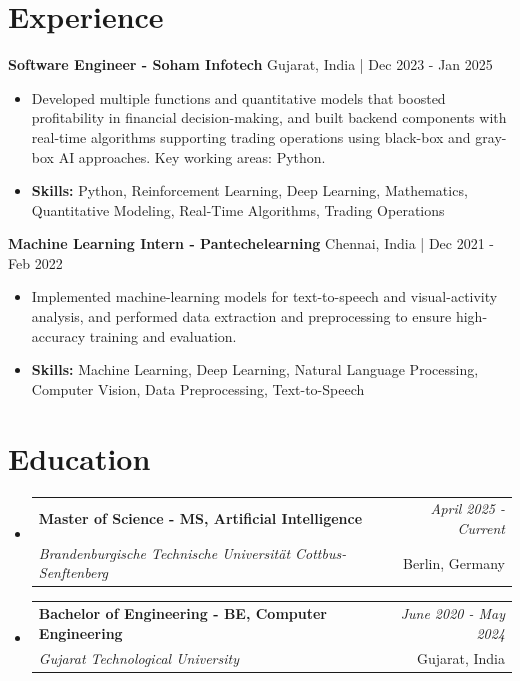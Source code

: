 \documentclass[a4paper,11pt]{article}
\makeatletter
\newcommand{\resumeSubheading}[4]{
\vspace{0.5mm}\item
    \begin{tabular*}{\linewidth}[t]{l@{\extracolsep{\fill}}r}
        \textbf{#1} & \textit{\footnotesize{#4}} \\
        \textit{\footnotesize{#3}} &  \footnotesize{#2}\\
    \end{tabular*}
    \vspace{-2.4mm}
}
\makeatother
\begin{document}
\section{\textbf{Experience}}


\vspace{1mm}
  \textbf{Software Engineer - Soham Infotech} \hfill Gujarat, India | Dec 2023 - Jan 2025
\vspace{-1.5mm} %
\begin{itemize}
  \item Developed multiple functions and quantitative models that boosted profitability in financial decision-making, and built backend components with real-time algorithms supporting trading operations using black-box and gray-box AI approaches. Key working areas: Python.

\vspace{-2mm}
  \item \textbf{Skills:} Python, Reinforcement Learning, Deep Learning, Mathematics, Quantitative Modeling, Real-Time Algorithms, Trading Operations
\end{itemize}

\vspace{1mm}
  \textbf{Machine Learning Intern - Pantechelearning} \hfill Chennai, India | Dec 2021 - Feb 2022
\vspace{-1.5mm} %
\begin{itemize}
  \item Implemented machine-learning models for text-to-speech and visual-activity analysis, and performed data extraction and preprocessing to ensure high-accuracy training and evaluation.
\vspace{-2mm}
  \item \textbf{Skills:} Machine Learning, Deep Learning, Natural Language Processing, Computer Vision, Data Preprocessing, Text-to-Speech
\end{itemize}\section{\textbf{Education}}
\vspace{-0.4mm}

\begin{itemize}[leftmargin=0.15in, label={}]
\resumeSubheading
{Master of Science - MS, Artificial Intelligence }{Berlin, Germany}
{Brandenburgische Technische Universität Cottbus-Senftenberg  }{April 2025 - Current}

\vspace{1.0mm} %
\resumeSubheading
{Bachelor of Engineering - BE, Computer Engineering  }{Gujarat, India}
{Gujarat Technological University }{June 2020 - May 2024}

\end{itemize}
\end{document}
